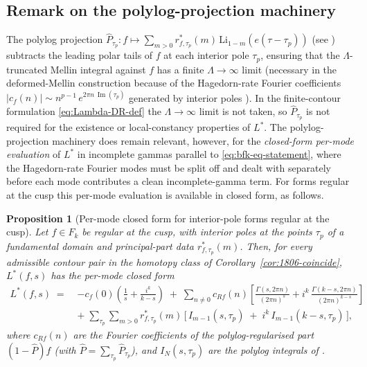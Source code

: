\documentclass[11pt]{article}
\newtheorem{proposition}[theorem]{Proposition}
\numberwithin{equation}{section}  %
\DeclareMathOperator{\im}{Im}
\begin{document}
\subsection{Remark on the polylog-projection machinery}\label{subsec:polylog-remark}

The polylog projection $\widehat{P}_{\tau_p}\colon f \mapsto
\sum_{m > 0}r_{f, \tau_p}^*(m)\,\mathrm{Li}_{1 - m}(e(\tau - \tau_p))$
(see \cite[\S2.2]{1806}) subtracts the leading polar tails of $f$ at
each interior pole $\tau_p$, ensuring that the $\Lambda$-truncated
Mellin integral against $f$ has a finite $\Lambda \to \infty$ limit
(necessary in the deformed-Mellin construction because of the
Hagedorn-rate Fourier coefficients $|c_f(n)| \sim n^{p-1}\,
e^{2\pi n\,\im(\tau_p)}$ generated by interior poles
\cite[Prop.~1.1, 2.7]{1806}).  In the finite-contour formulation
\eqref{eq:Lambda-DR-def} the $\Lambda \to \infty$ limit is not taken,
so $\widehat{P}_{\tau_p}$ is not required for the existence or
local-constancy properties of $L^*$.  The
polylog-projection machinery does remain relevant, however, for the
\emph{closed-form per-mode evaluation} of $L^*$ in
incomplete gammas parallel to \eqref{eq:bfk-eq-statement}, where the
Hagedorn-rate Fourier modes must be split off and dealt with
separately before each mode contributes a clean incomplete-gamma
term.  For forms regular at the cusp this per-mode evaluation is
available in closed form, as follows.

\begin{proposition}[Per-mode closed form for interior-pole forms regular at the cusp]\label{prop:interior-pole-modes}
Let $f \in F_k$ be regular at the cusp, with interior poles at the
points $\tau_p$ of a fundamental domain and principal-part data
$r^*_{f, \tau_p}(m)$.  Then, for every admissible contour pair in the
homotopy class of Corollary~\ref{cor:1806-coincide}, $L^*(f, s)$ has
the per-mode closed form
\begin{equation}\label{eq:interior-pole-modes}
\begin{aligned}
  L^*(f, s)
  \;=\;& -c_f(0)\!\left(\frac{1}{s} + \frac{i^k}{k - s}\right)
  \;+\; \sum_{n \ne 0} c_{Rf}(n)\!\left[\frac{\Gamma(s, 2\pi n)}{(2\pi n)^s} + i^k\,\frac{\Gamma(k - s, 2\pi n)}{(2\pi n)^{k - s}}\right]\\
  &+\; \sum_{\tau_p}\sum_{m > 0} r^*_{f, \tau_p}(m)\,\bigl[\,I_{m-1}(s, \tau_p) \;+\; i^k\,I_{m-1}(k - s, \tau_p)\,\bigr],
\end{aligned}
\end{equation}
where $c_{Rf}(n)$ are the Fourier coefficients of the
polylog-regularised part $(1 - \widehat{P})f$ (with $\widehat{P} =
\sum_{\tau_p}\widehat{P}_{\tau_p}$), and $I_{N}(s, \tau_p)$ are the
polylog integrals of \cite[\S2]{1806}.
\end{proposition}
\end{document}
